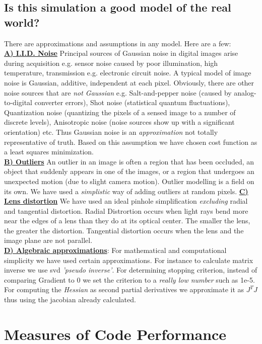 \documentclass[titlepage]{article}
\begin{document}
\subsection{Is this simulation a good model of the real world?}
\label{realistic}
There are approximations and assumptions in any model. Here are a few: \\\textbf{\underline{A) I.I.D. Noise}} Principal sources of Gaussian noise in digital images arise during acquisition e.g. sensor noise caused by poor illumination, high temperature, transmission e.g. electronic circuit noise. A typical model of image noise is Gaussian, additive, independent at each pixel. Obviously, there are other noise sources that are \textit{not Gaussian} e.g. Salt-and-pepper noise (caused by analog-to-digital converter errors), Shot noise (statistical quantum fluctuations), Quantization noise (quantizing the pixels of a sensed image to a number of discrete levels), Anisotropic noise (noise sources show up with a significant orientation) etc. Thus Gaussian noise is an \textit{approximation} not totally representative of truth. Based on this assumption we have chosen cost function as a least squares minimization. \\\textbf{\underline{ B) Outliers}} An outlier in an image is often a region that has been occluded, an object that suddenly appears in one of the images, or a region that undergoes an unexpected motion (due to slight camera motion). Outlier modelling is a field on its own. We have used a \textit{simplistic} way of adding outliers at random pixels. \textbf{\underline{C) Lens distortion}} We have used an ideal pinhole simplification \textit{excluding} radial and tangential distortion. Radial Distrortion occurs when light rays bend more near the edges of a lens than they do at its optical center. The smaller the lens, the greater the distortion. Tangential distortion occurs when the lens and the image plane are not parallel.\\ \textbf{\underline{D) Algebraic approximations}}: For mathematical and computational simplicity we have used certain approximations. For instance to calculate matrix inverse we use svd \textit{'pseudo inverse'}. For determining stopping criterion, instead of comparing Gradient to 0 we set the criterion to a \textit{really low number} such as 1e-5. For computing the \textit{Hessian} as second partial derivatives we approximate it as $J^{T}J$ thus using the jacobian already calculated.
\section{Measures of Code Performance}
\end{document}
